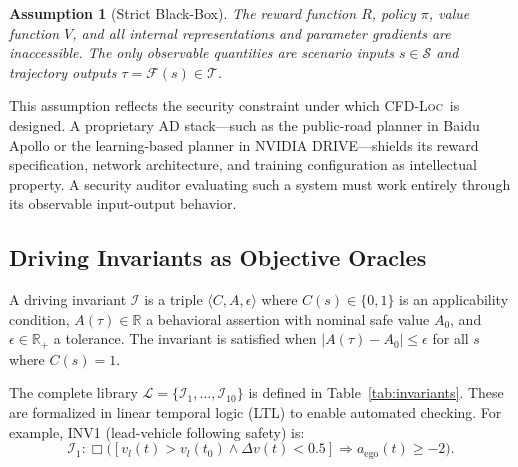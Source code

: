 \documentclass[journal]{IEEEtran}
\theoremstyle{plain}
\newtheorem{assumption}{Assumption}[section]
\newcommand{\methodname}{\textsc{CFD-Loc}}
\newcommand{\invlib}{\mathcal{L}}
\newcommand{\sys}{\mathcal{F}}
\newcommand{\R}{\mathbb{R}}
\begin{document}
\begin{assumption}[Strict Black-Box]\label{assump:blackbox}
The reward function $R$, policy $\pi$, value function $V$, and all internal representations and parameter gradients are inaccessible. The only observable quantities are scenario inputs $s \in \mathcal{S}$ and trajectory outputs $\tau = \sys(s) \in \mathcal{T}$.
\end{assumption}

This assumption reflects the security constraint under which \methodname\ is designed. A proprietary AD stack---such as the public-road planner in Baidu Apollo or the learning-based planner in NVIDIA DRIVE---shields its reward specification, network architecture, and training configuration as intellectual property. A security auditor evaluating such a system must work entirely through its observable input-output behavior.

\subsection{Driving Invariants as Objective Oracles}

A driving invariant $\mathcal{I}$ is a triple $\langle C, A, \epsilon \rangle$ where $C(s) \in \{0,1\}$ is an applicability condition, $A(\tau) \in \R$ a behavioral assertion with nominal safe value $A_0$, and $\epsilon \in \R_+$ a tolerance. The invariant is satisfied when $|A(\tau) - A_0| \leq \epsilon$ for all $s$ where $C(s)=1$.

The complete library $\invlib = \{\mathcal{I}_1,\dots,\mathcal{I}_{10}\}$ is defined in Table~\ref{tab:invariants}. These are formalized in linear temporal logic (LTL) to enable automated checking. For example, INV1 (lead-vehicle following safety) is:
\begin{equation}
\mathcal{I}_1: \Box\big([v_l(t) > v_l(t_0) \land \Delta v(t) < 0.5] \Rightarrow a_{\text{ego}}(t) \geq -2\big).
\end{equation}
\end{document}
